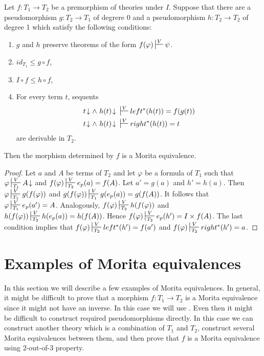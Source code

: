 \documentclass[reqno]{amsart}
\theoremstyle{definition}
\theoremstyle{remark}
\numberwithin{figure}{section}
\begin{document}
\begin{lem}
Let $f : T_1 \to T_2$ be a premorphism of theories under $I$.
Suppose that there are a pseudomorphism $g : T_2 \to T_1$ of degrere 0 and a pseudomorphism $h : T_2 \to T_2$ of degree 1 which satisfy the following conditions:
\begin{enumerate}
\item $g$ and $h$ preserve theorems of the form $f(\varphi) \sststile{}{V} \psi$.
\item $id_{T_1} \leq g \circ f$,
\item $I \circ f \leq h \circ f$,
\item For every term $t$, sequents
\begin{align*}
t\!\downarrow \land\ h(t)\!\downarrow\ & \sststile{}{V} left^*(h(t)) = f(g(t)) \\
t\!\downarrow \land\ h(t)\!\downarrow\ & \sststile{}{V} right^*(h(t)) = t
\end{align*}
are derivable in $T_2$.
\end{enumerate}
Then the morphism determined by $f$ is a Morita equivalence.
\end{lem}
\begin{proof}
Let $a$ and $A$ be terms of $T_2$ and let $\varphi$ be a formula of $T_1$ such that $\varphi \sststile{T_1}{V} A\!\downarrow$ and $f(\varphi) \sststile{T_2}{V} e_p(a) = f(A)$.
Let $a' = g(a)$ and $h' = h(a)$.
Then $\varphi \sststile{T_1}{V} g(f(\varphi))$ and $g(f(\varphi)) \sststile{T_1}{V} g(e_p(a)) = g(f(A))$.
It follows that $\varphi \sststile{T_1}{V} e_p(a') = A$.
Analogously, $f(\varphi) \sststile{T_2}{V} h(f(\varphi))$ and $h(f(\varphi)) \sststile{T_2}{V} h(e_p(a)) = h(f(A))$.
Hence $f(\varphi) \sststile{T_2}{V} e_p(h') = I \times f(A)$.
The last condition implies that $f(\varphi) \sststile{T_2}{V} left^*(h') = f(a')$ and $f(\varphi) \sststile{T_2}{V} right^*(h') = a$.
\end{proof}

\section{Examples of Morita equivalences}

In this section we will describe a few examples of Morita equivalences.
In general, it might be difficult to prove that a morphism $f : T_1 \to T_2$ is a Morita equivalence since it might not have an inverse.
In this case we will use .
Even then it might be difficult to construct required pseudomorphisms directly.
In this case we can construct another theory which is a combination of $T_1$ and $T_2$, construct several Morita equivalences between them,
and then prove that $f$ is a Morita equivalence using 2-out-of-3 property.
\end{document}
